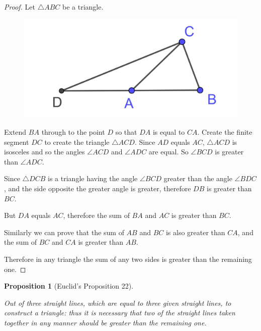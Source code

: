 \documentclass[
]{book}
\newtheorem{proposition}{Proposition}[chapter]
\theoremstyle{definition}
\theoremstyle{definition}
\theoremstyle{definition}
\theoremstyle{definition}
\theoremstyle{remark}
\begin{document}
\begin{proof}

Let \(\triangle ABC\) be a triangle.

\begin{figure}

{\centering \includegraphics[width=0.3\linewidth]{images/prop20} 

}

\end{figure}

Extend \(BA\) through to the point \(D\) so that \(DA\) is equal to \(CA\). Create the finite segment \(DC\) to create the triangle \(\triangle ACD\). Since \(AD\) equals \(AC\), \(\triangle ACD\) is isosceles and so the angles \(\angle ACD\) and \(\angle ADC\) are equal. So \(\angle BCD\) is greater than \(\angle ADC\).

Since \(\triangle DCB\) is a triangle having the angle \(\angle BCD\) greater than the angle \(\angle BDC\), and the side opposite the greater angle is greater, therefore \(DB\) is greater than \(BC\).

But \(DA\) equals \(AC\), therefore the sum of \(BA\) and \(AC\) is greater than \(BC\).

Similarly we can prove that the sum of \(AB\) and \(BC\) is also greater than \(CA\), and the sum of \(BC\) and \(CA\) is greater than \(AB\).

Therefore in any triangle the sum of any two sides is greater than the remaining one.

\end{proof}

\begin{proposition}[Euclid's Proposition 22]
\protect\hypertarget{prp:prop22}{}\label{prp:prop22}

Out of three straight lines, which are equal to three given straight lines, to construct a triangle: thus it is necessary that two of the straight lines taken together in any manner should be greater than the remaining one.

\end{proposition}
\end{document}
